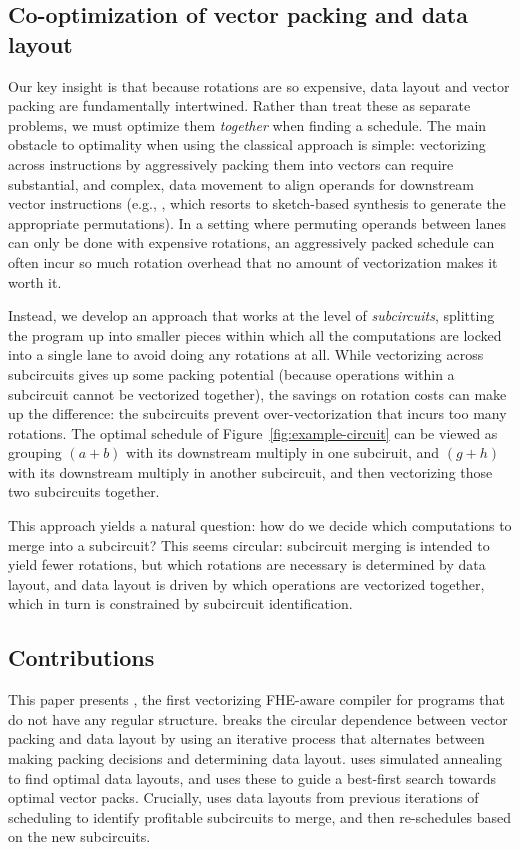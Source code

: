 \subsection*{Co-optimization of vector packing and data layout}
Our key insight is that because rotations are so expensive, data layout and vector packing are fundamentally intertwined. Rather than treat these as separate problems, we must optimize them {\em together} when finding a schedule.
The main obstacle to optimality when using the classical approach is simple: vectorizing across instructions by aggressively packing them into vectors can require substantial, and complex, data movement to align operands for downstream vector instructions (e.g., \citet{SwizzleInventor}, which resorts to sketch-based synthesis to generate the appropriate permutations). In a setting where permuting operands between lanes can only be done with expensive rotations, an aggressively packed schedule can often incur so much rotation overhead that no amount of vectorization makes it worth it.

Instead, we develop an approach that works at the level of {\em subcircuits}, splitting the program up into smaller pieces within which all the computations are locked into a single lane to avoid doing any rotations at all. While vectorizing across subcircuits gives up some packing potential (because operations within a subcircuit cannot be vectorized together), the savings on rotation costs can make up the difference: the subcircuits prevent over-vectorization that incurs too many rotations. The optimal schedule of Figure~\ref{fig:example-circuit} can be viewed as grouping $(a + b)$ with its downstream multiply in one subciruit, and $(g + h)$ with its downstream multiply in another subcircuit, and then vectorizing those two subcircuits together.

This approach yields a natural question: how do we decide which computations to merge into a subcircuit? This seems circular: subcircuit merging is intended to yield fewer rotations, but which rotations are necessary is determined by data layout, and data layout is driven by which operations are vectorized together, which in turn is constrained by subcircuit identification. 


\subsection*{Contributions}

This paper presents \system, the first vectorizing FHE-aware compiler for programs that do not have any regular structure. \system breaks the circular dependence between vector packing and data layout by using an iterative process that alternates between making packing decisions and determining data layout. \system uses simulated annealing to find optimal data layouts, and uses these to guide a best-first search towards optimal vector packs. Crucially, \system uses data layouts from previous iterations of scheduling to identify profitable subcircuits to merge, and then re-schedules based on the new subcircuits.


